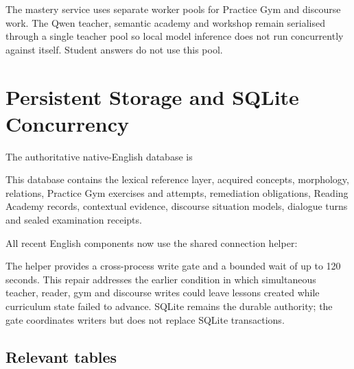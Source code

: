 \documentclass[11pt,a4paper]{article}
\begin{document}
The mastery service uses separate worker pools for Practice Gym and discourse work. The Qwen
teacher, semantic academy and workshop remain serialised through a single teacher pool so local
model inference does not run concurrently against itself. Student answers do not use this pool.

\section{Persistent Storage and SQLite Concurrency}

The authoritative native-English database is

\begin{quote}
\end{quote}

This database contains the lexical reference layer, acquired concepts, morphology, relations,
Practice Gym exercises and attempts, remediation obligations, Reading Academy records,
contextual evidence, discourse situation models, dialogue turns and sealed examination receipts.

All recent English components now use the shared connection helper:

\begin{quote}
\end{quote}

The helper provides a cross-process write gate and a bounded wait of up to 120 seconds. This
repair addresses the earlier condition in which simultaneous teacher, reader, gym and discourse
writes could leave lessons created while curriculum state failed to advance. SQLite remains the
durable authority; the gate coordinates writers but does not replace SQLite transactions.

\subsection{Relevant tables}
\end{document}
